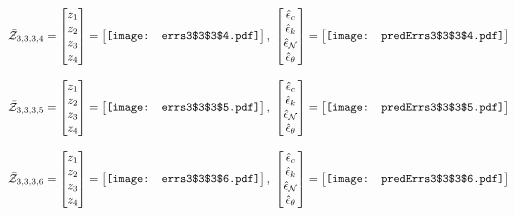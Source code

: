 \documentclass[12pt]{article}
\begin{document}
\begin{gather*}
\bar{\mathcal{Z}}_{3,3,3,4}=\begin{bmatrix}
z_1\\
z_2\\
z_3\\
z_4
 \end{bmatrix}= \begin{bmatrix}
\vcenter{\hbox{\texttt{[image: errs3\$3\$3\$4.pdf]}}}
 \end{bmatrix},\,\, \begin{bmatrix}
\hat{\epsilon}_c\\\hat{\epsilon}_k\\\hat{\epsilon}_\mathcal{N}\\\hat{\epsilon}_\theta
 \end{bmatrix}=\begin{bmatrix}
\vcenter{\hbox{\texttt{[image: predErrs3\$3\$3\$4.pdf]}}}
 \end{bmatrix}
\end{gather*}

\begin{gather*}
\bar{\mathcal{Z}}_{3,3,3,5}=\begin{bmatrix}
z_1\\
z_2\\
z_3\\
z_4
 \end{bmatrix}= \begin{bmatrix}
\vcenter{\hbox{\texttt{[image: errs3\$3\$3\$5.pdf]}}}
 \end{bmatrix},\,\, \begin{bmatrix}
\hat{\epsilon}_c\\\hat{\epsilon}_k\\\hat{\epsilon}_\mathcal{N}\\\hat{\epsilon}_\theta
 \end{bmatrix}=\begin{bmatrix}
\vcenter{\hbox{\texttt{[image: predErrs3\$3\$3\$5.pdf]}}}
 \end{bmatrix}
\end{gather*}


\begin{gather*}
\bar{\mathcal{Z}}_{3,3,3,6}=\begin{bmatrix}
z_1\\
z_2\\
z_3\\
z_4
 \end{bmatrix}= \begin{bmatrix}
\vcenter{\hbox{\texttt{[image: errs3\$3\$3\$6.pdf]}}}
 \end{bmatrix},\,\, \begin{bmatrix}
\hat{\epsilon}_c\\\hat{\epsilon}_k\\\hat{\epsilon}_\mathcal{N}\\\hat{\epsilon}_\theta
 \end{bmatrix}=\begin{bmatrix}
\vcenter{\hbox{\texttt{[image: predErrs3\$3\$3\$6.pdf]}}}
 \end{bmatrix}
\end{gather*}
\end{document}

